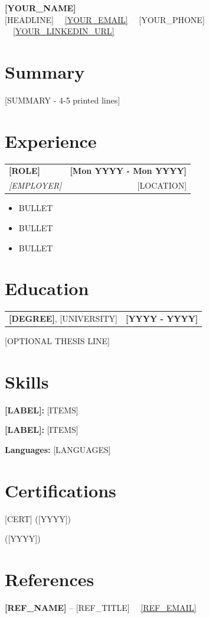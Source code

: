 \documentclass[letterpaper,10pt]{article}
\makeatletter
\newcommand{\ulink}[2]{\href{#1}{\textcolor{linkblue}{\underline{#2}}}}
\newcommand{\cventry}[4]{%
  \needspace{5\baselineskip}%
  \begin{tabularx}{\textwidth}{@{}X r@{}}
    \textbf{#1} & \textbf{#2} \\
    \textit{#3} & \textcolor{locgrey}{#4} \\
  \end{tabularx}\par\vspace{1pt}}
\newenvironment{cvbullets}{%
  \begin{itemize}[leftmargin=12pt,label=\textbullet,itemsep=0pt,parsep=0pt,topsep=1pt]\small}%
  {\end{itemize}\vspace{3pt}}
\newcommand{\cvskill}[2]{\textbf{#1:} #2\par}
\makeatother
\begin{document}
\begin{center}
  {\LARGE\bfseries [YOUR_NAME]}\\[3pt]
  \small [HEADLINE] \ \textbar\ \ulink{mailto:[YOUR_EMAIL]}{[YOUR_EMAIL]} \ \textbar\ [YOUR_PHONE] \ \textbar\ \ulink{https://[YOUR_LINKEDIN_URL]}{[YOUR_LINKEDIN_URL]}
\end{center}
\vspace{-6pt}

\section{Summary}
{\small [SUMMARY - 4-5 printed lines]\par}

\section{Experience}
\cventry{[ROLE]}{[Mon YYYY - Mon YYYY]}{[EMPLOYER]}{[LOCATION]}
\begin{cvbullets}
  \item [BULLET]
  \item [BULLET]
  \item [BULLET]
\end{cvbullets}

\section{Education}
\begin{tabularx}{\textwidth}{@{}X r@{}}
  \textbf{[DEGREE]}, [UNIVERSITY] & \textbf{[YYYY - YYYY]} \\
\end{tabularx}\par
{\small [OPTIONAL THESIS LINE]\par}

\section{Skills}
{\small
\cvskill{[LABEL]}{[ITEMS]}
\cvskill{[LABEL]}{[ITEMS]}
\cvskill{Languages}{[LANGUAGES]}
}

\section{Certifications}
{\small
[CERT] ([YYYY])\par
[CERT] ([YYYY])\par
}

\section{References}
{\small
\textbf{[REF_NAME]} -- [REF_TITLE] \ \textbar\ \ulink{mailto:[REF_EMAIL]}{[REF_EMAIL]}\par
}
\end{document}
